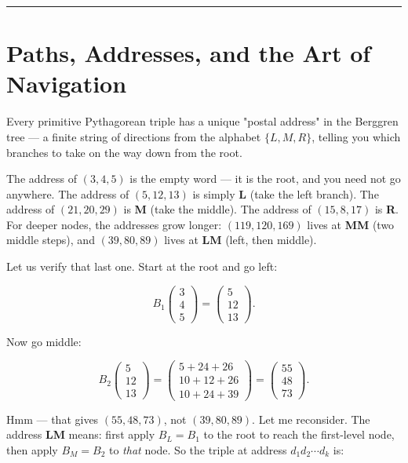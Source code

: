 \documentclass[12pt, letterpaper, openany]{book}
\theoremstyle{definition}
\theoremstyle{remark}
\begin{document}
\bigskip\noindent\rule{\textwidth}{0.4pt}\bigskip



\section*{Paths, Addresses, and the Art of Navigation}


Every primitive Pythagorean triple has a unique "postal address" in the Berggren tree --- a finite string of directions from the alphabet $\{L, M, R\}$, telling you which branches to take on the way down from the root.

The address of $(3, 4, 5)$ is the empty word --- it is the root, and you need not go anywhere. The address of $(5, 12, 13)$ is simply \textbf{L} (take the left branch). The address of $(21, 20, 29)$ is \textbf{M} (take the middle). The address of $(15, 8, 17)$ is \textbf{R}. For deeper nodes, the addresses grow longer: $(119, 120, 169)$ lives at \textbf{MM} (two middle steps), and $(39, 80, 89)$ lives at \textbf{LM} (left, then middle).

Let us verify that last one. Start at the root and go left:

\[
B_1 \begin{pmatrix} 3 \\ 4 \\ 5 \end{pmatrix} = \begin{pmatrix} 5 \\ 12 \\ 13 \end{pmatrix}.
\]

Now go middle:

\[
B_2 \begin{pmatrix} 5 \\ 12 \\ 13 \end{pmatrix} = \begin{pmatrix} 5 + 24 + 26 \\ 10 + 12 + 26 \\ 10 + 24 + 39 \end{pmatrix} = \begin{pmatrix} 55 \\ 48 \\ 73 \end{pmatrix}.
\]

Hmm --- that gives $(55, 48, 73)$, not $(39, 80, 89)$. Let me reconsider. The address \textbf{LM} means: first apply $B_L = B_1$ to the root to reach the first-level node, then apply $B_M = B_2$ to \textit{that} node. So the triple at address $d_1 d_2 \cdots d_k$ is:
\end{document}
